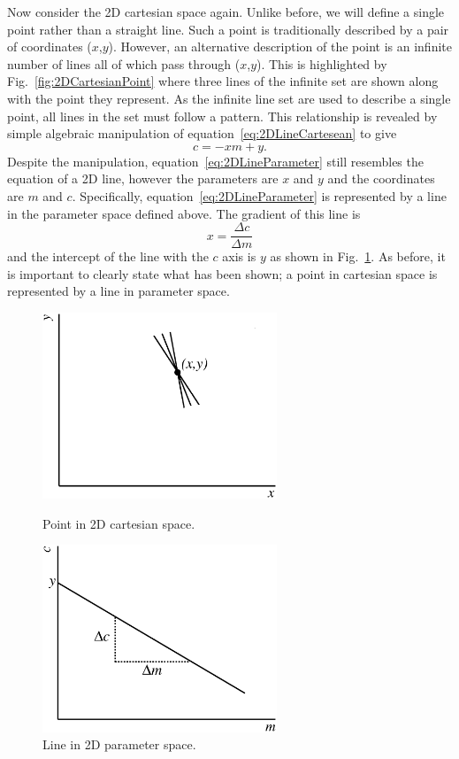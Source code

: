 \newline
Now consider the 2D cartesian space again.  Unlike before, we will define a single point rather than a straight line. Such a point is traditionally described by a pair of coordinates ($x$,$y$).  However, an alternative description of the point is an infinite number of lines all of which pass through ($x$,$y$).  This is highlighted by Fig.~\ref{fig:2DCartesianPoint} where three lines of the infinite set are shown along with the point they represent.  As the infinite line set are used to describe a single point, all lines in the set must follow a pattern.  This relationship is revealed by simple algebraic manipulation of equation~\ref{eq:2DLineCartesean} to give
\begin{equation}
  c = -xm + y.
  \label{eq:2DLineParameter}
\end{equation}
Despite the manipulation, equation~\ref{eq:2DLineParameter} still resembles the equation of a 2D line, however the parameters are $x$ and $y$ and the coordinates are $m$ and $c$.  Specifically, equation~\ref{eq:2DLineParameter} is represented by a line in the parameter space defined above.  The gradient of this line is 
\begin{equation}
  x = \frac{\Delta c}{\Delta m}
  \label{eq:2DLineGradientParameterSpace}
\end{equation}
and the intercept of the line with the $c$ axis is $y$ as shown in Fig.~\ref{fig:2DParameterLine}.  As before, it is important to clearly state what has been shown; a point in cartesian space is represented by a line in parameter space.

\begin{figure}
  \centering
  \parbox{7cm}{
    \includegraphics[width=7cm]{images/hough_transform/cartesian_point}
    \caption{Point in 2D cartesian space.}
    \label{fig:2DCartesianPoint}}
    \qquad
    \begin{minipage}{7cm}
      \includegraphics[width=7cm]{images/hough_transform/parameter_line}
      \caption{Line in 2D parameter space.}
      \label{fig:2DParameterLine}
    \end{minipage}
\end{figure}

